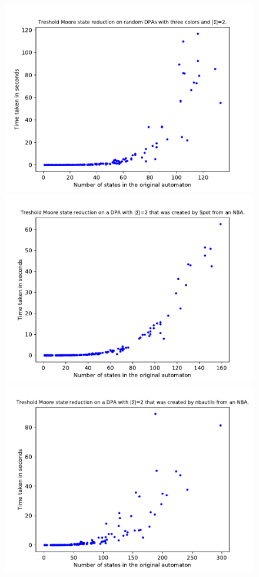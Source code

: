\begin{figure}
	\centering
	\begin{minipage}{0.49\textwidth}
		\includegraphics[page=4,height=.3\textheight]{../data/analysis/threshold_moore/gendet_ap1.pdf} 
		\includegraphics[page=4,height=.3\textheight]{../data/analysis/threshold_moore/detspot_ap1.pdf} 
		\includegraphics[page=4,height=.3\textheight]{../data/analysis/threshold_moore/detnbaut_ap1.pdf} 

\end{minipage}
\end{figure}
